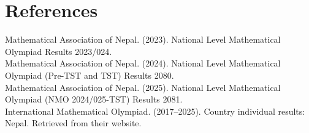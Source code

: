\documentclass{report}
\begin{document}
\newpage
\section*{References}
Mathematical Association of Nepal. (2023). National Level Mathematical Olympiad Results 2023/024. \\
Mathematical Association of Nepal. (2024). National Level Mathematical Olympiad (Pre-TST and TST) Results 2080. \\
Mathematical Association of Nepal. (2025). National Level Mathematical Olympiad (NMO 2024/025-TST) Results 2081. \\
International Mathematical Olympiad. (2017–2025). Country individual results: Nepal. Retrieved from their website.
\end{document}

